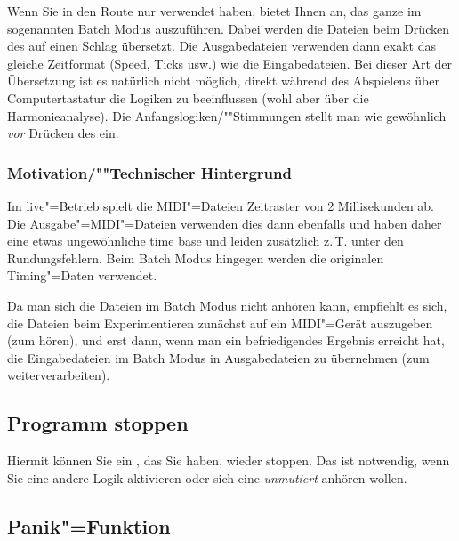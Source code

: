 Wenn Sie in den Route nur  verwendet 
haben, bietet \mutabor{} Ihnen an, das ganze im sogenannten 
Batch Modus auszuführen. Dabei werden die Dateien beim Drücken 
des  auf einen Schlag übersetzt. 
Die Ausgabedateien verwenden dann exakt das gleiche Zeitformat 
(Speed, Ticks usw.) wie die Eingabedateien. Bei dieser Art der 
Übersetzung ist es natürlich nicht möglich, direkt während 
des Abspielens über Computertastatur die Logiken zu beeinflussen 
(wohl aber über die Harmonieanalyse). Die Anfangslogiken/""Stimmungen 
stellt man wie gewöhnlich \emph{vor} Drücken des  
ein.

\subsubsection{Motivation/""Technischer Hintergrund}


Im live"=Betrieb spielt \mutabor{} die MIDI"=Dateien Zeitraster 
von 2 Millisekunden ab. Die Ausgabe"=MIDI"=Dateien verwenden dies 
dann ebenfalls und haben daher eine etwas ungewöhnliche time 
base und leiden zusätzlich z.\,T. unter den Rundungsfehlern. 
Beim Batch Modus hingegen werden die originalen Timing"=Daten 
verwendet.


Da man sich die Dateien im Batch Modus nicht anhören kann, 
empfiehlt es sich, die Dateien beim Experimentieren zunächst 
auf ein MIDI"=Gerät auszugeben (zum hören), und erst dann, 
wenn man ein befriedigendes Ergebnis erreicht hat, die Eingabedateien 
im Batch Modus in Ausgabedateien zu übernehmen (zum weiterverarbeiten).


\subsection{Programm stoppen}\label{sec:MI_STOP}



Hiermit können Sie ein ,
das Sie  haben, wieder stoppen. Das 
ist notwendig, wenn Sie eine andere Logik aktivieren oder sich 
eine  \textit{unmutiert} anhören wollen.


\subsection{Panik"=Funktion}\label{sec:MI_PANIC}



